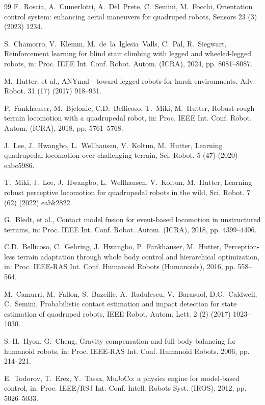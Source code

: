 \documentclass[a4paper,fleqn]{cas-dc}
\begin{document}
\begin{thebibliography}{99}
F.~Roscia, A.~Cumerlotti, A.~Del~Prete, C.~Semini, M.~Focchi, Orientation
control system: enhancing aerial maneuvers for quadruped robots, Sensors 23 (3)
(2023) 1234.

S.~Chamorro, V.~Klemm, M.~de~la~Iglesia~Valls, C.~Pal, R.~Siegwart,
Reinforcement learning for blind stair climbing with legged and wheeled-legged
robots, in: Proc. IEEE Int. Conf. Robot. Autom. (ICRA), 2024, pp. 8081--8087.

M.~Hutter, et al., ANYmal---toward legged robots for harsh environments, Adv.
Robot. 31 (17) (2017) 918--931.

P.~Fankhauser, M.~Bjelonic, C.D.~Bellicoso, T.~Miki, M.~Hutter, Robust
rough-terrain locomotion with a quadrupedal robot, in: Proc. IEEE Int. Conf.
Robot. Autom. (ICRA), 2018, pp. 5761--5768.

J.~Lee, J.~Hwangbo, L.~Wellhausen, V.~Koltun, M.~Hutter, Learning quadrupedal
locomotion over challenging terrain, Sci. Robot. 5 (47) (2020) eabc5986.

T.~Miki, J.~Lee, J.~Hwangbo, L.~Wellhausen, V.~Koltun, M.~Hutter, Learning
robust perceptive locomotion for quadrupedal robots in the wild, Sci. Robot. 7
(62) (2022) eabk2822.

G.~Bledt, et al., Contact model fusion for event-based locomotion in
unstructured terrains, in: Proc. IEEE Int. Conf. Robot. Autom. (ICRA), 2018,
pp. 4399--4406.

C.D.~Bellicoso, C.~Gehring, J.~Hwangbo, P.~Fankhauser, M.~Hutter,
Perception-less terrain adaptation through whole body control and hierarchical
optimization, in: Proc. IEEE-RAS Int. Conf. Humanoid Robots (Humanoids), 2016,
pp. 558--564.

M.~Camurri, M.~Fallon, S.~Bazeille, A.~Radulescu, V.~Barasuol, D.G.~Caldwell,
C.~Semini, Probabilistic contact estimation and impact detection for state
estimation of quadruped robots, IEEE Robot. Autom. Lett. 2 (2) (2017)
1023--1030.

S.-H.~Hyon, G.~Cheng, Gravity compensation and full-body balancing for humanoid
robots, in: Proc. IEEE-RAS Int. Conf. Humanoid Robots, 2006, pp. 214--221.

E.~Todorov, T.~Erez, Y.~Tassa, MuJoCo: a physics engine for model-based
control, in: Proc. IEEE/RSJ Int. Conf. Intell. Robots Syst. (IROS), 2012, pp.
5026--5033.


\end{thebibliography}
\end{document}
